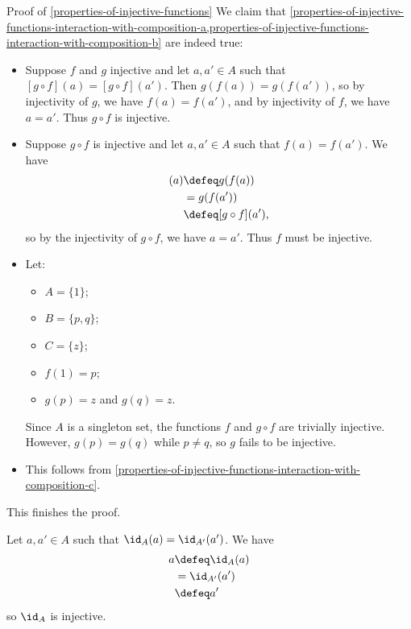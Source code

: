 \begin{Proof}{Proof of \cref{properties-of-injective-functions}}
    We claim that \cref{properties-of-injective-functions-interaction-with-composition-a,properties-of-injective-functions-interaction-with-composition-b} are indeed true:
    \begin{itemize}
        \item{}Suppose $f$ and $g$ injective and let $a,a'\in A$ such that $[g\circ f](a)=[g\circ f](a')$. Then $g(f(a)) = g(f(a'))$, so by injectivity of $g$, we have $f(a) = f(a')$, and by injectivity of $f$, we have $a = a'$. Thus $g \circ f$ is injective.
        \item{}Suppose $g\circ f$ is injective and let $a,a'\in A$ such that $f(a) = f(a')$. We have
            \begin{align*}
                [g\circ f](a) &\defeq g(f(a))\\
                              &=      g(f(a'))\\
                              &\defeq [g\circ f](a'),
            \end{align*}
            so by the injectivity of $g\circ f$, we have $a = a'$. Thus $f$ must be injective.
        \item{}Let:
            \begin{itemize}
                \item $A=\{1\}$;
                \item $B=\{p,q\}$;
                \item $C=\{z\}$;
                \item $f(1)=p$;
                \item $g(p)=z$ and $g(q)=z$.
            \end{itemize}
            Since $A$ is a singleton set, the functions $f$ and $g\circ f$ are trivially injective. However, $g(p)=g(q)$ while $p\neq q$, so $g$ fails to be injective.
        \item{}This follows from \cref{properties-of-injective-functions-interaction-with-composition-c}.
    \end{itemize}
    This finishes the proof.

    Let $a,a'\in A$ such that $\id_{A}(a)=\id_{A'}(a')$. We have
    \begin{align*}
        a &\defeq \id_{A}(a)\\
          &=      \id_{A'}(a')\\
          &\defeq a'
    \end{align*}
    so $\id_{A}$ is injective.
\end{Proof}
